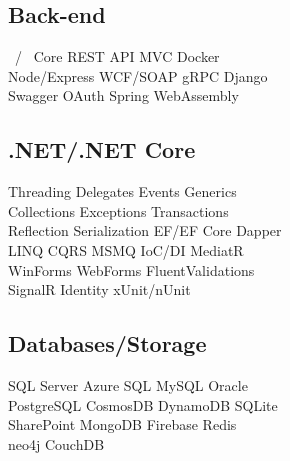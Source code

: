\documentclass[letterpaper]{cv_12} %
\begin{document}
\begin{minipage}[t]{0.39\textwidth}
    \sectionspace%

    \subsection{Back-end}

    \dotnet\ / \dotnet\ Core \textbullet{} REST API \textbullet{} MVC
    \textbullet{} Docker\\
    Node/Express \textbullet{} WCF/SOAP \textbullet{} gRPC \textbullet{}
    Django\\
    Swagger \textbullet{} OAuth \textbullet{} Spring \textbullet{}
    WebAssembly

    \sectionspace%

    \subsection{.NET/.NET Core}

    Threading \textbullet{} Delegates \textbullet{} Events \textbullet{}
    Generics\\
    Collections \textbullet{} Exceptions \textbullet{} Transactions\\
    Reflection \textbullet{} Serialization \textbullet{} EF/EF Core
    \textbullet{} Dapper\\
    LINQ \textbullet{} CQRS \textbullet{} MSMQ \textbullet{} IoC/DI
    \textbullet{} MediatR\\
    WinForms \textbullet{} WebForms \textbullet{} FluentValidations\\
    SignalR \textbullet{} Identity \textbullet{} xUnit/nUnit

    \sectionspace%

    \subsection{Databases/Storage}

    SQL Server \textbullet{} Azure SQL \textbullet{} MySQL \textbullet{}
    Oracle\\
    PostgreSQL \textbullet{} CosmosDB \textbullet{} DynamoDB \textbullet{}
    SQLite\\
    SharePoint \textbullet{} MongoDB \textbullet{} Firebase \textbullet{} 
    Redis\\
    neo4j \textbullet{} CouchDB

    \sectionspace%


\end{minipage}
\end{document}
